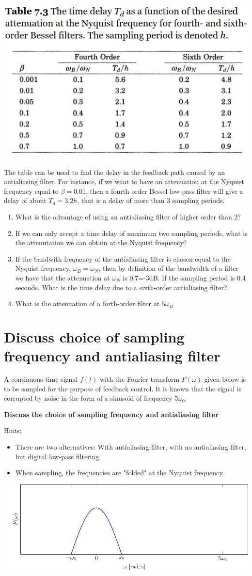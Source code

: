 \documentclass[letterpaper]{scrartcl}
\begin{document}
\begin{center}
\includegraphics[width=0.4\linewidth]{../figures/Astrom-fig73.png}
\end{center}
The table can be used to find the delay in the feedback path caused by an antialiasing filter. For instance, if we want to have an attenuation at the Nyquist frequency equal to \(\beta = 0.01\), then a fourth-order Bessel low-pass filter will give a delay of about \(T_d = 3.2 h\), that is a delay of more than 3 sampling periods. 
\begin{enumerate}
\item What is the advantage of using an antialiasing filter of higher order than 2?
\item If we can only accept a time delay of maximum two sampling periods, what is the attenutation we can obtain at the Nyquist frequency?
\item If the bandwith frequency of the antialiasing filter is chosen equal to the Nyquist frequency, \(\omega_B = \omega_N\), then by definition of the bandwidth of a filter we have that the attenuation at \(\omega_N\) is 0.7=-3dB. If the sampling period is 0.4 seconds. What is the time delay due to a sixth-order antialiasing filter?
\item What is the attenuation of a forth-order filter at \(5\omega_B\)
\end{enumerate}

\section*{Discuss choice of sampling frequency and antialiasing filter}
\label{sec-3}
A continuous-time signal $f(t)$ with the Fourier transform $F(\omega)$ given below is to be sampled for the purpose of feedback control. It is known that the signal is corrupted by noise in the form of a sinusoid of frequency $5\omega_0$.

\textbf{Discuss the choice of sampling frequency and antialiasing filter}

Hints: 
\begin{itemize}
\item There are two alternatives: With antialiasing filter, with no antialiasing filter, but digital low-pass filtering.
\item When sampling, the frequencies are "folded" at the Nyquist frequency.
\end{itemize}

\begin{center}
\includegraphics[width=0.7\linewidth]{../figures/choose-sampling-frequency}
\end{center}
\end{document}
